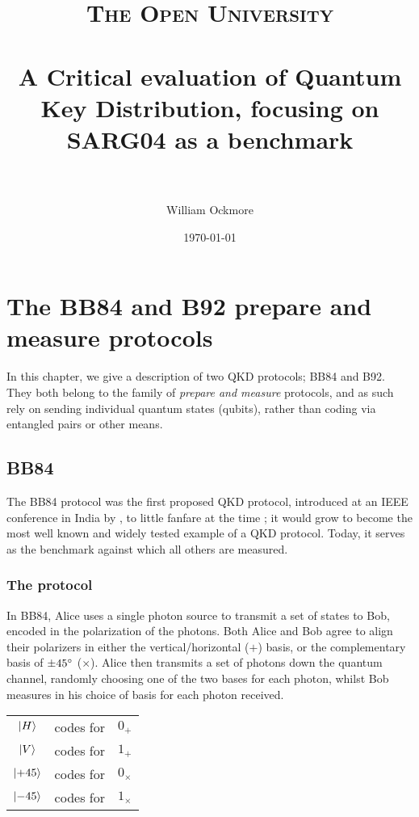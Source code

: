 \documentclass[paper=a4, fontsize=11pt]{scrartcl} %
\title{
\normalfont \normalsize
\textsc{The Open University} \\ [25pt] %
\horrule{0.5pt} \\[0.4cm] %
\huge A Critical evaluation of Quantum Key Distribution, focusing on SARG04 as a benchmark \\ %
\horrule{2pt} \\[0.5cm] %
}
\author{William Ockmore} %
\date{\normalsize\today} %
\numberwithin{equation}{section} %
\numberwithin{figure}{section} %
\numberwithin{table}{section} %
\begin{document}
\maketitle %

\tableofcontents


\section{The BB84 and B92 prepare and measure protocols}

In this chapter, we give a description of two QKD protocols; BB84 and B92.
They both belong to the family of \textit{prepare and measure} protocols, and as
such rely on sending individual quantum states (qubits), rather than coding
via entangled pairs or other means.

\subsection{BB84}

The BB84 protocol was the first proposed QKD protocol, introduced at
an IEEE conference in India by \citet{BB84}, to little fanfare at the
time \citep{historyBrassard}; it would grow to become the most well known
and widely tested example of a QKD protocol. Today, it serves as
the benchmark against which all others are measured.

\subsubsection{The protocol}
In BB84, Alice uses a single photon source to transmit a set of states to Bob,
encoded in the polarization of the photons. Both Alice and Bob agree to align
their polarizers in either the vertical/horizontal ($+$) basis, or the
complementary basis of $\pm 45 \degree$  ($\times$). Alice then transmits a set of photons
down the quantum channel, randomly choosing one of the two bases for each
photon, whilst Bob measures in his choice of basis for each photon received.

\begin{center}
\begin{tabular}{c c c}
	$\ket{H}$  & codes for & $0_+$ \\
	$\ket{V}$  & codes for & $1_+$ \\
	$\ket{+45}$  & codes for & $0_\times$ \\
	$\ket{-45}$  & codes for & $1_\times$ \\
\end{tabular}
\end{center}
\end{document}
